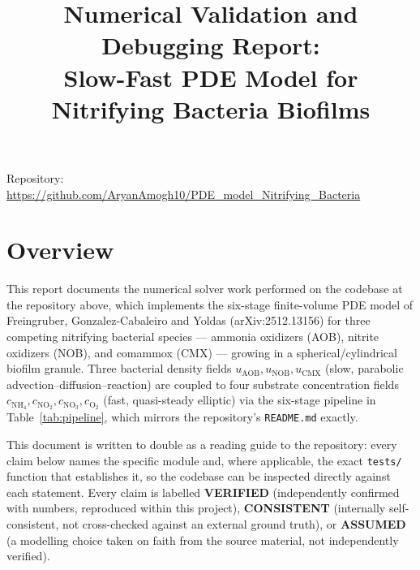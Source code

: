 \documentclass[11pt]{article}
\title{\vspace{-1.7em}Numerical Validation and Debugging Report:\\
Slow-Fast PDE Model for Nitrifying Bacteria Biofilms}
\author{}
\date{}
\newcommand{\verified}{\textcolor{green!45!black}{\textbf{VERIFIED}}}
\newcommand{\consistent}{\textcolor{blue!55!black}{\textbf{CONSISTENT}}}
\newcommand{\assumed}{\textcolor{orange!70!black}{\textbf{ASSUMED}}}
\newcommand{\code}[1]{\texttt{#1}}
\begin{document}
\maketitle
\vspace{-3em}

\begin{center}
\small Repository: \url{https://github.com/AryanAmogh10/PDE_model_Nitrifying_Bacteria}
\end{center}
\vspace{0.3em}

\section{Overview}

This report documents the numerical solver work performed on the codebase at
the repository above, which implements the six-stage finite-volume PDE model
of Freingruber, Gonzalez-Cabaleiro and Yoldas (arXiv:2512.13156) for three
competing nitrifying bacterial species --- ammonia oxidizers (AOB), nitrite
oxidizers (NOB), and comammox (CMX) --- growing in a spherical/cylindrical
biofilm granule. Three bacterial density fields $u_{\mathrm{AOB}},
u_{\mathrm{NOB}}, u_{\mathrm{CMX}}$ (slow, parabolic
advection--diffusion--reaction) are coupled to four substrate concentration
fields $c_{\mathrm{NH_4}}, c_{\mathrm{NO_2}}, c_{\mathrm{NO_3}}, c_{\mathrm{O_2}}$
(fast, quasi-steady elliptic) via the six-stage pipeline in
Table~\ref{tab:pipeline}, which mirrors the repository's \code{README.md}
exactly.

This document is written to double as a reading guide to the repository: every
claim below names the specific module and, where applicable, the exact
\code{tests/} function that establishes it, so the codebase can be inspected
directly against each statement. Every claim is labelled \verified{}
(independently confirmed with numbers, reproduced within this project),
\consistent{} (internally self-consistent, not cross-checked against an
external ground truth), or \assumed{} (a modelling choice taken on faith from
the source material, not independently verified).
\end{document}
